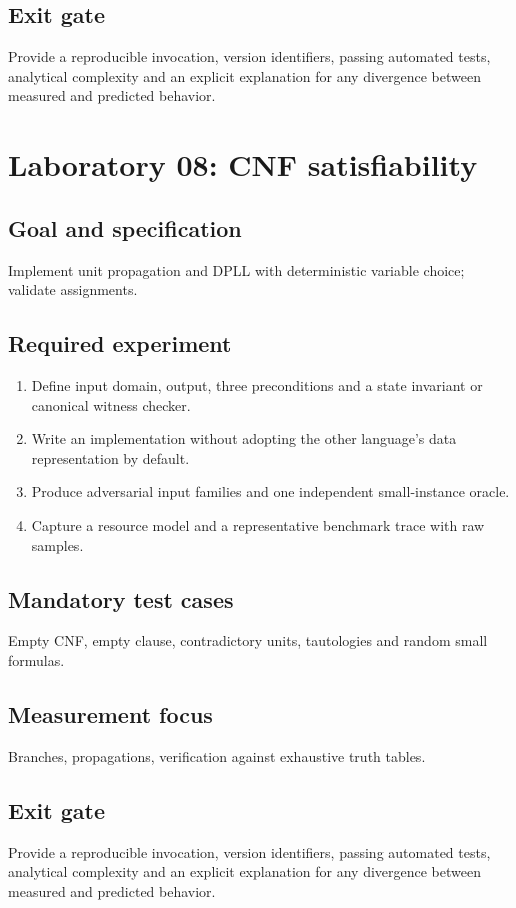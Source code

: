 \documentclass[11pt,letterpaper]{article}
\begin{document}
\subsection{Exit gate}
Provide a reproducible invocation, version identifiers, passing automated tests, analytical complexity and an explicit explanation for any divergence between measured and predicted behavior.

\section{Laboratory 08: CNF satisfiability}
\subsection{Goal and specification}
Implement unit propagation and DPLL with deterministic variable choice; validate assignments.
\subsection{Required experiment}
\begin{enumerate}
\item Define input domain, output, three preconditions and a state invariant or canonical witness checker.
\item Write an implementation without adopting the other language's data representation by default.
\item Produce adversarial input families and one independent small-instance oracle.
\item Capture a resource model and a representative benchmark trace with raw samples.
\end{enumerate}
\subsection{Mandatory test cases}
Empty CNF, empty clause, contradictory units, tautologies and random small formulas.
\subsection{Measurement focus}
Branches, propagations, verification against exhaustive truth tables.
\subsection{Exit gate}
Provide a reproducible invocation, version identifiers, passing automated tests, analytical complexity and an explicit explanation for any divergence between measured and predicted behavior.
\end{document}
